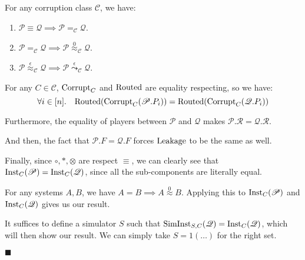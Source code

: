 \begin{theorem}
  \label{thm:equality_hierarchy}
For any corruption class $\mathscr{C}$, we have:
\begin{enumerate}
\item $\mathscr{P} \equiv \mathscr{Q} \implies \mathscr{P} =_\mathscr{C} \mathscr{Q}$.
\item $\mathscr{P} =_{\mathscr{C}} \mathscr{Q} \implies \mathscr{P} \overset{0}{\approx}_\mathscr{C} \mathscr{Q}$.
\item $\mathscr{P} \overset{\epsilon}{\approx}_{\mathscr{C}} \mathscr{Q} \implies \mathscr{P} \overset{\epsilon}{\leadsto}_\mathscr{C} \mathscr{Q}$.
\end{enumerate}


For any $C \in \mathscr{C}$, $\text{Corrupt}_{C}$ and $\text{Routed}$ are equality respecting,
so we have:
$$
\forall i \in [n].\quad \text{Routed}(\text{Corrupt}_C(\mathscr{P}.P_i)) = 
\text{Routed}(\text{Corrupt}_C(\mathscr{Q}.P_i))
$$

Furthermore, the equality of players between $\mathscr{P}$ and $\mathscr{Q}$
makes $\mathscr{P}.\mathcal{R} = \mathscr{Q}.\mathcal{R}$.

And then, the fact that $\mathscr{P}.F = \mathscr{Q}.F$ forces $\text{Leakage}$
to be the same as well.

Finally, since $\circ, *, \otimes$ are respect $\equiv$, we
can clearly see that $\text{Inst}_C(\mathscr{P}) = \text{Inst}_C(\mathscr{Q})$,
since all the sub-components are literally equal.

 For any systems $A, B$, we have $A = B \implies A \overset{0}{\approx} B$.
Applying this to $\text{Inst}_C(\mathscr{P})$ and $\text{Inst}_C(\mathscr{Q})$
gives us our result.

 It suffices to define a simulator $S$ such that
$\text{SimInst}_{S, C}(\mathscr{Q}) = \text{Inst}_C(\mathscr{Q})$,
which will then show our result.
We can simply take $S = 1(\ldots)$ for the right set.

$\blacksquare$
\end{theorem}

